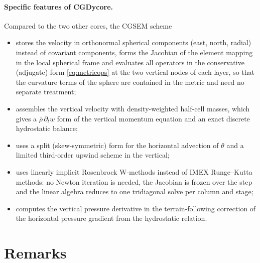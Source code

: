 \documentclass[11pt,a4paper]{article}
\begin{document}
\paragraph{Specific features of CGDycore.}
Compared to the two other cores, the CGSEM scheme
\begin{itemize}
\item stores the velocity in orthonormal spherical components (east, north,
  radial) instead of covariant components, forms the Jacobian of the element
  mapping in the local spherical frame and evaluates all operators in the
  conservative (adjugate) form \eqref{eq:metricops} at the two vertical
  nodes of each layer, so that the curvature terms of the sphere are
  contained in the metric and need no separate treatment;
\item assembles the vertical velocity with density-weighted half-cell masses,
  which gives a $\bar\rho\,\partial_t w$ form of the vertical momentum
  equation and an exact discrete hydrostatic balance;
\item uses a split (skew-symmetric) form for the horizontal advection of
  $\theta$ and a limited third-order upwind scheme in the vertical;
\item uses linearly implicit Rosenbrock W-methods instead of IMEX Runge--Kutta
  methods: no Newton iteration is needed, the Jacobian is frozen over the
  step and the linear algebra reduces to one tridiagonal solve per column
  and stage;
\item computes the vertical pressure derivative in the terrain-following
  correction of the horizontal pressure gradient from the hydrostatic
  relation.
\end{itemize}

\section{Remarks}
\end{document}
